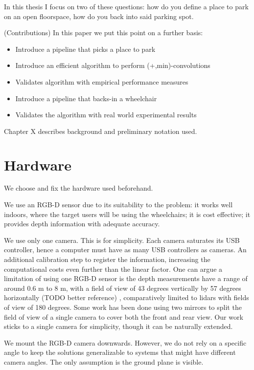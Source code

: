 In this thesis I focus on two of these questions: how do you define a place to
park on an open floorspace, how do you back into said parking spot.

(Contributions) In this paper we put this point on a further basis:
\begin{itemize}
\item Introduce a pipeline that picks a place to park
\item Introduce an efficient algorithm to perform (+,min)-convolutions
\item Validates algorithm with empirical performance measures
\item Introduce a pipeline that backs-in a wheelchair
\item Validates the algorithm with real world experimental results
\end{itemize}

Chapter X describes background and preliminary notation used.

\section{Hardware}
We choose and fix the hardware used beforehand.

We use an RGB-D sensor due to its suitability to the problem:
it works well indoors, where the target users will be using the wheelchairs; it
is cost effective; it provides depth information with adequate accuracy.

We use only one camera. This is for simplicity. Each camera saturates its USB
controller, hence a computer must have as many USB controllers as cameras.
An additional calibration step to register the information, increasing the
computational costs even further than the linear factor. 
One can argue a limitation of using one RGB-D sensor is the depth measurements
have a range of around 0.6 m to 8 m, with a field of view of 43 degrees
vertically by 57 degrees horizontally (TODO better reference) \cite{endres2014catadioptric},
comparatively limited to lidars with fields of view of 180 degrees. Some work
\cite{endres2014catadioptric} has been done using two mirrors to split the field
of view of a single camera to cover both the front and rear view. Our work
sticks to a single camera for simplicity, though it can be naturally extended.

We mount the RGB-D camera downwards. However, we do not rely on a specific angle
to keep the solutions generalizable to systems that might have different camera
angles. The only assumption is the ground plane is visible.

